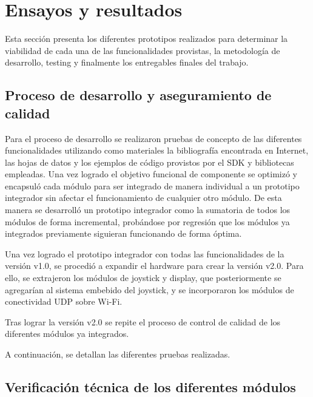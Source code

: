 
\chapter{Ensayos y resultados} %

\label{Chapter4} %

Esta sección presenta los diferentes prototipos realizados para determinar la viabilidad de cada una de las funcionalidades provistas, la metodología de desarrollo, testing y finalmente los entregables finales del trabajo.

\section{Proceso de desarrollo y aseguramiento de calidad}
\label{sec:pruebasHW}

Para el proceso de desarrollo se realizaron pruebas de concepto de las diferentes funcionalidades utilizando como materiales la bibliografía encontrada en Internet, las hojas de datos y los ejemplos de código provistos por el SDK y bibliotecas empleadas. Una vez logrado el objetivo funcional de componente se optimizó y encapsuló cada módulo para ser integrado de manera individual a un prototipo integrador sin afectar el funcionamiento de cualquier otro módulo.
De esta manera se desarrolló un prototipo integrador como la sumatoria de todos los módulos de forma incremental, probándose por regresión que los módulos ya integrados previamente siguieran funcionando de forma óptima.

Una vez logrado el prototipo integrador con todas las funcionalidades de la versión v1.0, se procedió a expandir el hardware para crear la versión v2.0. Para ello, se extrajeron los módulos de joystick y display, que posteriormente se agregarían al sistema embebido del joystick, y se incorporaron los módulos de conectividad UDP sobre Wi-Fi.

Tras lograr la versión v2.0 se repite el proceso de control de calidad de los diferentes módulos ya integrados.

A continuación, se detallan las diferentes pruebas realizadas.

\section{Verificación técnica de los diferentes módulos}


